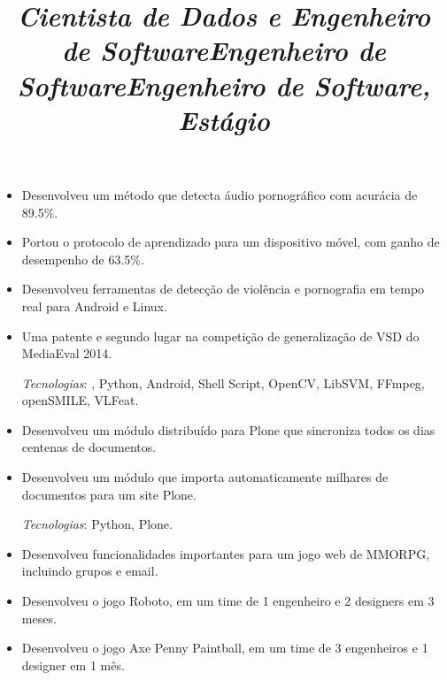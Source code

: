 \begin{resume}
\title{\emph{Cientista de Dados e Engenheiro de Software}}
\begin{position}
\vspace{1mm}
\begin{itemize}\small
\item Desenvolveu um m\'etodo que detecta \'audio pornogr\'afico com acur\'acia de 89.5\%.
\item Portou o protocolo de aprendizado para um dispositivo
  m\'ovel, com ganho de desempenho de 63.5\%.
\item Desenvolveu ferramentas de detec\c{c}\~ao de viol\^encia e pornografia em tempo real para Android e Linux.
\item Uma patente e segundo lugar na competi\c{c}\~ao de generaliza\c{c}\~ao de VSD do MediaEval 2014.

\vspace{1mm}
{\small \emph{Tecnologias}: \Cplusplus, Python, Android, Shell Script, OpenCV, LibSVM,
FFmpeg, openSMILE, VLFeat\@.}
\end{itemize}
\end{position}

\title{\emph{Engenheiro de Software}}
\begin{position}
\vspace{1mm}
\begin{itemize}\small
\item Desenvolveu um m\'odulo distribu\'ido para Plone que sincroniza todos os dias centenas de documentos.
\item Desenvolveu um m\'odulo que importa automaticamente milhares de documentos para um site Plone.

\vspace{1mm}
{\small \emph{Tecnologias}: Python, Plone\@.}
\end{itemize}
\end{position}

\title{\emph{Engenheiro de Software, Est\'agio}}
\begin{position}
\vspace{1mm}
\begin{itemize}\small
  \item Desenvolveu funcionalidades importantes para um jogo web de MMORPG,
  incluindo grupos e email.
\item Desenvolveu o jogo Roboto, em um time de 1 engenheiro e 2 designers em 3
  meses.
\item Desenvolveu o jogo Axe Penny Paintball, em um time de 3 engenheiros e 1
  designer em 1 m\^es.


\end{itemize}
\end{position}
\end{resume}
